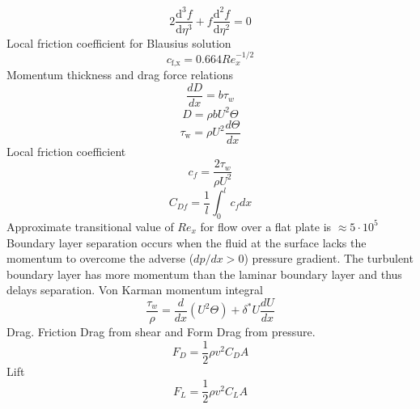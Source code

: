 \documentclass{article}
\begin{document}
\begin{equation}
  2 \frac{\text{d}^3 f}{\text{d} \eta^3} + f \frac{\text{d}^2 f}{\text{d} \eta^2} = 0
\end{equation}
Local friction coefficient for Blausius solution
\begin{equation}
  c_\text{f,x} = 0.664 Re_x^{-1/2}
\end{equation}
\newline
\newline
Momentum thickness and drag force relations
\begin{equation}
  \frac{dD}{dx} = b \tau_w
\end{equation}
\begin{equation}
  D = \rho b U^2 \Theta
\end{equation}
\begin{equation}
  \tau_\text{w} = \rho U^2 \frac{d \Theta}{d x}
\end{equation}
\newline
\newline
Local friction coefficient
\begin{equation}
  c_f = \frac{2\tau_w}{\rho U^2}
\end{equation}
\begin{equation}
  C_{Df} = \frac{1}{l}\int_0^l c_f dx
\end{equation}
\newline
\newline
Approximate transitional value of $Re_x$ for flow over a flat plate is $\approx 5 \cdot 10^5$
Boundary layer separation occurs when the fluid at the surface lacks the momentum to overcome the adverse ($dp/dx > 0$) pressure gradient. The turbulent boundary layer has more momentum than the laminar boundary layer and thus delays separation.
\newline
\newline
Von Karman momentum integral
\begin{equation}
  \frac{\tau_w}{\rho} =  \frac{d}{dx}(U^2\Theta) + \delta^* U\frac{dU}{dx}
\end{equation}
Drag. Friction Drag from shear and Form Drag from pressure. 
\begin{equation}
  F_D = \frac{1}{2}\rho v^2 C_D A
\end{equation}
\newline
\newline
Lift
\begin{equation}
  F_L = \frac{1}{2}\rho v^2 C_L A
\end{equation}
\newline
\end{document}
